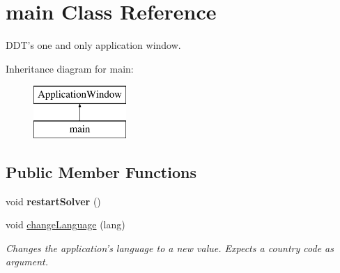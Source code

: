\hypertarget{classmain}{\section{main Class Reference}
\label{classmain}
}


D\-D\-T's one and only application window.  


Inheritance diagram for main\-:\begin{figure}[H]
\begin{center}
\leavevmode
\includegraphics[height=2.000000cm]{classmain}
\end{center}
\end{figure}
\subsection*{Public Member Functions}
\begin{DoxyCompactItemize}
\item 
\hypertarget{classmain_a0c9e48faded0ac8427a982654422988b}{void {\bfseries restart\-Solver} ()}\label{classmain_a0c9e48faded0ac8427a982654422988b}

\item 
\hypertarget{classmain_a62b940da31d74ffbe7445af00bfd6a1f}{void \hyperlink{classmain_a62b940da31d74ffbe7445af00bfd6a1f}{change\-Language} (lang)}\label{classmain_a62b940da31d74ffbe7445af00bfd6a1f}

\begin{DoxyCompactList}\small\item\em Changes the application's language to a new value. Expects a country code as argument. \end{DoxyCompactList}\end{DoxyCompactItemize}
